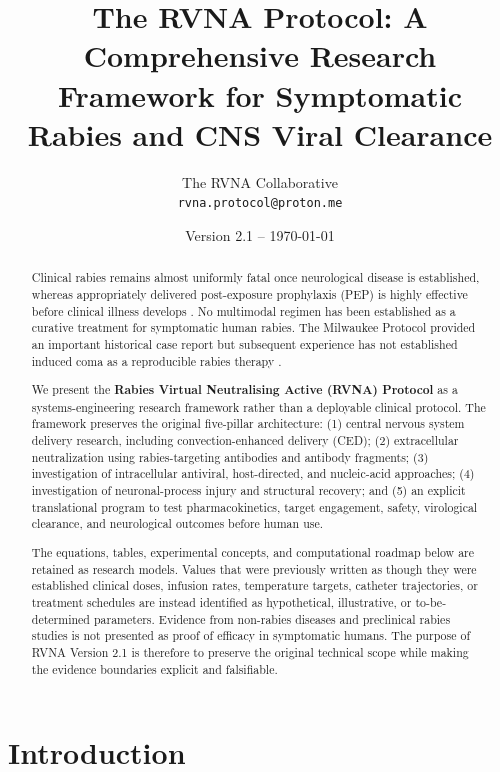 \documentclass[12pt,a4paper]{article}
\title{\textbf{The RVNA Protocol: A Comprehensive Research Framework for Symptomatic Rabies and CNS Viral Clearance}}
\author{The RVNA Collaborative\\[0.2cm]
    \small{\texttt{rvna.protocol@proton.me}}}
\date{Version 2.1 -- \today}
\begin{document}
\maketitle

\begin{abstract}
Clinical rabies remains almost uniformly fatal once neurological disease is established, whereas appropriately delivered post-exposure prophylaxis (PEP) is highly effective before clinical illness develops \citep{who2024rabies, cdc2026rabies, cdc2026pep}. No multimodal regimen has been established as a curative treatment for symptomatic human rabies. The Milwaukee Protocol provided an important historical case report but subsequent experience has not established induced coma as a reproducible rabies therapy \citep{willoughby2005, jackson2011therapy, jackson2025demise}.

We present the \textbf{Rabies Virtual Neutralising Active (RVNA) Protocol} as a systems-engineering research framework rather than a deployable clinical protocol. The framework preserves the original five-pillar architecture: (1) central nervous system delivery research, including convection-enhanced delivery (CED); (2) extracellular neutralization using rabies-targeting antibodies and antibody fragments; (3) investigation of intracellular antiviral, host-directed, and nucleic-acid approaches; (4) investigation of neuronal-process injury and structural recovery; and (5) an explicit translational program to test pharmacokinetics, target engagement, safety, virological clearance, and neurological outcomes before human use.

The equations, tables, experimental concepts, and computational roadmap below are retained as research models. Values that were previously written as though they were established clinical doses, infusion rates, temperature targets, catheter trajectories, or treatment schedules are instead identified as hypothetical, illustrative, or to-be-determined parameters. Evidence from non-rabies diseases and preclinical rabies studies is not presented as proof of efficacy in symptomatic humans. The purpose of RVNA Version 2.1 is therefore to preserve the original technical scope while making the evidence boundaries explicit and falsifiable.
\end{abstract}

\section{Introduction}
\end{document}
